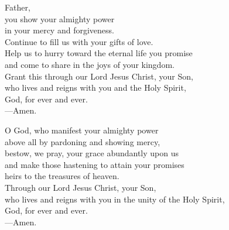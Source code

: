 \prayer


\begin{prayerverse}
Father,\\
you show your almighty power\\
in your mercy and forgiveness.\\
Continue to fill us with your gifts of love.\\
Help us to hurry toward the eternal life you promise\\
and come to share in the joys of your kingdom.\\
Grant this through our Lord Jesus Christ, your Son,\\
who lives and reigns with you and the Holy Spirit,\\
God, for ever and ever.\\
{\color{red}---\thinspace}Amen.
\end{prayerverse}


\begin{prayerverse}
O God, who manifest your almighty power\\
above all by pardoning and showing mercy,\\
bestow, we pray, your grace abundantly upon us\\
and make those hastening to attain your promises\\
heirs to the treasures of heaven.\\
Through our Lord Jesus Christ, your Son,\\
who lives and reigns with you in the unity of the Holy Spirit,\\
God, for ever and ever.\\
{\color{red}---\thinspace}Amen.
\end{prayerverse}

